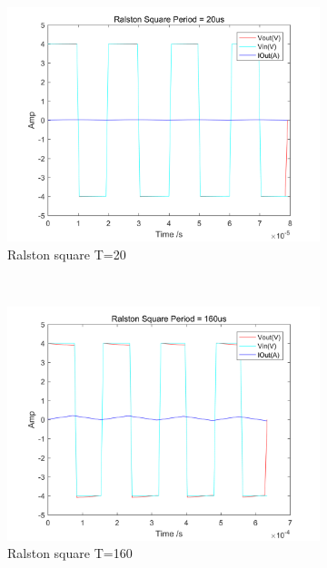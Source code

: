 \documentclass[a4paper, 12pt]{article}
\begin{document}
\begin{figure}[h]
      \centering
      \begin{subfigure}[b]{0.4\textwidth}
            \includegraphics[width=\textwidth]{ex1/new_ralston_square_20.png}
            \caption{Ralston square T=20}
      \end{subfigure}
      ~
      \begin{subfigure}[b]{0.4\textwidth}
            \includegraphics[width=\textwidth]{ex1/new_ralston_square_160.png}
            \caption{Ralston square T=160}
      \end{subfigure}
       ~
      \begin{subfigure}[b]{0.4\textwidth}

\end{subfigure}
\end{figure}
\end{document}
